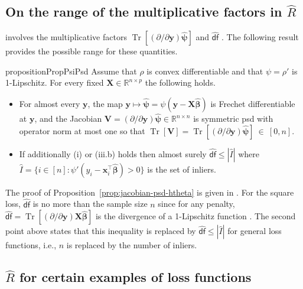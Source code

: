 \documentclass[11pt]{amsart}
\numberwithin{equation}{section}
\numberwithin{equation}{section}
\def\real{{\mathbb{R}}}
\def\R{{\real}}
\DeclareMathOperator{\trace}{Tr}
\def\mathbold{\boldsymbol} %
\def\bP{\mathbold{P}}\def\hbP{{\widehat{\bP}}}\def\tbP{{\widetilde{\bP}}}
\def\bV{\mathbold{V}}\def\hbV{{\widehat{\bV}}}\def\tbV{{\widetilde{\bV}}}
\def\bx{\mathbold{x}}\def\xhat{\widehat{x}}\def\xtil{\widetilde{x}}\def\xbar{{\overline x}}\def\vbx{{\bf x}}
\def\bX{\mathbold{X}}\def\hbX{{\widehat{\bX}}}\def\tbX{{\widetilde{\bX}}}\def\bXbar{{\overline \bX}}
\def\by{\mathbold{y}}\def\yhat{\widehat{y}}\def\ytil{\widetilde{y}}\def\ybar{{\overline y}}\def\vby{{\bf y}}
\def\bbeta{\mathbold{\beta}}\def\betahat{\widehat{\beta}}\def\hbeta{\widehat{\beta}}
\def\hbbeta{{{\widehat{\bbeta}}}}
\def\bpsi{\mathbold{\psi}}\def\psihat{\widehat{\psi}}\def\hpsi{\widehat{\psi}}
\def\hbpsi{{\widehat{\bpsi}}}\def\tbpsi{{\widetilde{\bpsi}}}
\def\df{{\hat{\mathsf{df}}}{}}
\newcommand\pb[1]{{ #1 }}
\begin{document}
\subsection{On the range of the multiplicative factors in $\hat R$}
 involves the multiplicative
factors $\trace[(\partial/\partial\by)\hbpsi]$
and \pb{$\df$}.
The following result provides
the possible range for these quantities.


\begin{restatable}{proposition}{PropPsiPsd}
    \label{prop:jacobian-psd-htheta}
    Assume that $\rho$ is convex differentiable and that $\psi=\rho'$ is 1-Lipschitz.
    For every fixed $\bX\in\R^{n\times p}$ the following holds.
    \begin{itemize}
    \item 
    For almost every $\by$,
     the map $\by\mapsto \hbpsi = \psi(\by-\bX\hbbeta)$ is Frechet differentiable at $\by$, 
     and the Jacobian $\bV = (\partial/\partial\by)\hbpsi\in\R^{n\times n}$ is symmetric
    psd with operator norm at most one so that
    $\trace[\bV]=\trace[({\partial}/{\partial\by})\hbpsi] ~\in~ [0,n]$.
    \item
    If additionally (i) or (iii.b) holds
    then almost surely
    $
    \pb{\df}
    \le |\hat I|
    $
    where $\hat I = \{i\in[n]: \psi'(y_i -\bx_i^\top\hbbeta)>0\}$
    is the set of inliers.
    \end{itemize}
\end{restatable}

The proof of Proposition~\ref{prop:jacobian-psd-htheta}
is given in .
For the square loss, $\df$ is no more than the sample
size $n$ since for any penalty, $\df=\trace[(\partial/\partial\by)\bX\hbbeta]$
is the divergence of a 1-Lipschitz function \cite[e.g.]{bellec2016bounds}.
The second point above states that this inequality is
replaced by $\df\le |\hat I|$ for general loss functions,
i.e., $n$ is replaced by the number of inliers.

\subsection{$\hat R$ for certain examples of loss functions}
\end{document}
